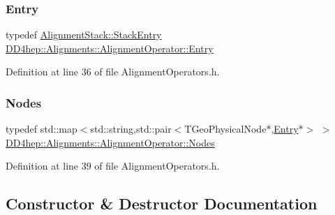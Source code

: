 \hypertarget{class_d_d4hep_1_1_alignments_1_1_alignment_operator_a0dc91b46151c3685f152574147339899}{}\label{class_d_d4hep_1_1_alignments_1_1_alignment_operator_a0dc91b46151c3685f152574147339899} 
\subsubsection{\texorpdfstring{Entry}{Entry}}
{\footnotesize\ttfamily typedef \hyperlink{struct_d_d4hep_1_1_alignments_1_1_alignment_stack_1_1_stack_entry}{Alignment\+Stack\+::\+Stack\+Entry} \hyperlink{class_d_d4hep_1_1_alignments_1_1_alignment_operator_a0dc91b46151c3685f152574147339899}{D\+D4hep\+::\+Alignments\+::\+Alignment\+Operator\+::\+Entry}}



Definition at line 36 of file Alignment\+Operators.\+h.

\hypertarget{class_d_d4hep_1_1_alignments_1_1_alignment_operator_a2f25eae1d38abc30a09f7a840ab0662a}{}\label{class_d_d4hep_1_1_alignments_1_1_alignment_operator_a2f25eae1d38abc30a09f7a840ab0662a} 
\subsubsection{\texorpdfstring{Nodes}{Nodes}}
{\footnotesize\ttfamily typedef std\+::map$<$std\+::string,std\+::pair$<$T\+Geo\+Physical\+Node$\ast$,\hyperlink{class_d_d4hep_1_1_alignments_1_1_alignment_operator_a0dc91b46151c3685f152574147339899}{Entry}$\ast$$>$ $>$ \hyperlink{class_d_d4hep_1_1_alignments_1_1_alignment_operator_a2f25eae1d38abc30a09f7a840ab0662a}{D\+D4hep\+::\+Alignments\+::\+Alignment\+Operator\+::\+Nodes}}



Definition at line 39 of file Alignment\+Operators.\+h.



\subsection{Constructor \& Destructor Documentation}
\hypertarget{class_d_d4hep_1_1_alignments_1_1_alignment_operator_a46730d86c085b06213e2d18714df0c02}{}\label{class_d_d4hep_1_1_alignments_1_1_alignment_operator_a46730d86c085b06213e2d18714df0c02} 
